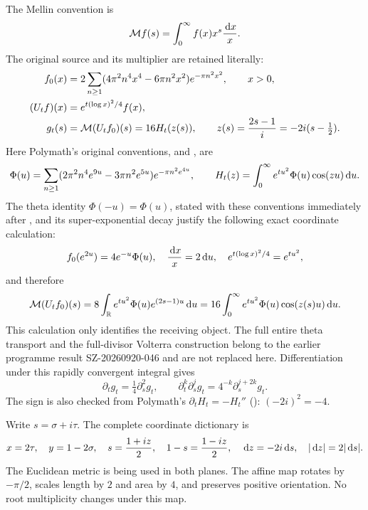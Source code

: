 \documentclass[11pt]{article}
\begin{document}
The Mellin convention is
\[
 \mathcal M f(s)=\int_0^\infty f(x)x^s\frac{\,\mathrm d x}{x}.
\]
The original source and its multiplier are retained literally:
\begin{equation}\label{pmreceiver:PMH1-objects}
\begin{split}
 f_0(x)&=2\sum_{n\ge1}
 (4\pi^2n^4x^4-6\pi n^2x^2)e^{-\pi n^2x^2},\qquad x>0,\\
 (U_tf)(x)&=e^{t(\log x)^2/4}f(x),\\
 g_t(s)&=\mathcal M(U_tf_0)(s)=16H_t(z(s)),\qquad
 z(s)=\frac{2s-1}{i}=-2i(s-\tfrac12).
\end{split}
\end{equation}
Here Polymath's original conventions,  and , are
\begin{equation}\label{pmreceiver:PMH1-Phi}
 \Phi(u)=\sum_{n\ge1}(2\pi^2n^4e^{9u}-3\pi n^2e^{5u})
 e^{-\pi n^2e^{4u}},\qquad
 H_t(z)=\int_0^\infty e^{tu^2}\Phi(u)\cos(zu)\,\mathrm d u.
\end{equation}
The theta identity $\Phi(-u)=\Phi(u)$, stated with these conventions
immediately after , and its super-exponential decay justify
the following exact coordinate calculation:
\[
 f_0(e^{2u})=4e^{-u}\Phi(u),\quad
 \frac{\,\mathrm d x}{x}=2\,\mathrm d u,\quad
 e^{t(\log x)^2/4}=e^{tu^2},
\]
and therefore
\[
 \mathcal M(U_tf_0)(s)
 =8\int_\mathbb R e^{tu^2}\Phi(u)e^{(2s-1)u}\,\mathrm d u
 =16\int_0^\infty e^{tu^2}\Phi(u)\cos(z(s)u)\,\mathrm d u.
\]
This calculation only identifies the receiving object. The full entire
theta transport and the full-divisor Volterra construction belong to
the earlier programme result SZ-20260920-046 and are not replaced here.
Differentiation under this rapidly convergent integral gives
\begin{equation}\label{pmreceiver:PMH1-heat}
 \partial_tg_t=\tfrac14\partial_s^2g_t,
 \qquad \partial_t^k\partial_s^jg_t
 =4^{-k}\partial_s^{j+2k}g_t.
\end{equation}
The sign is also checked from Polymath's $\partial_tH_t=-H_t''$
(): $(-2i)^2=-4$.

Write $s=\sigma+i\tau$. The complete coordinate dictionary is
\begin{equation}\label{pmreceiver:PMH1-coordinate}
 x=2\tau,\quad y=1-2\sigma,\quad
 s=\frac{1+iz}{2},\quad 1-s=\frac{1-iz}{2},\quad
 \,\mathrm d z=-2i\,\mathrm d s,\quad |\,\mathrm d z|=2|\,\mathrm d s|.
\end{equation}
The Euclidean metric is being used in both planes. The affine map
rotates by $-\pi/2$, scales length by $2$ and area by $4$, and preserves
positive orientation. No root multiplicity changes under this map.
\end{document}
